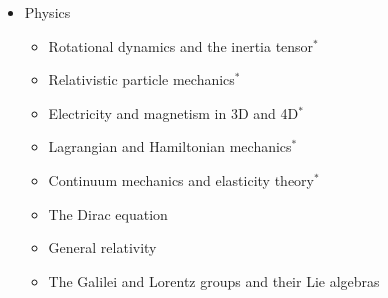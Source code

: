 \documentclass{utarticle}
\begin{document}
\begin{itemize}
\item Physics
          \begin{itemize}
          \item Rotational dynamics and the inertia tensor$^*$
          \item Relativistic particle mechanics$^*$
          \item Electricity and magnetism in 3D and 4D$^*$
          \item Lagrangian and Hamiltonian mechanics$^*$
          \item Continuum mechanics and elasticity theory$^*$
          \item The Dirac equation
          \item General relativity
          \item The Galilei and Lorentz groups and their Lie algebras
          \end{itemize}
\end{itemize}

\end{document}

